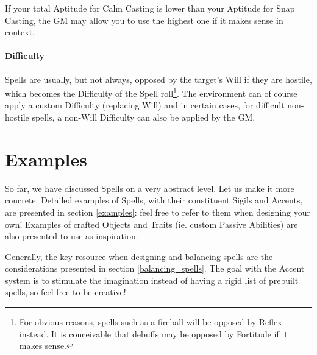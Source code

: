 If your total Aptitude for Calm Casting is lower than your Aptitude for Snap Casting, the GM may allow you to use the highest one if it makes sense in context.


\paragraph{Difficulty}

Spells are usually, but not always, opposed by the target's Will if they are hostile, which becomes the Difficulty of the Spell roll\footnote{For obvious reasons, spells such as a fireball will be opposed by Reflex instead. It is conceivable that debuffs may be opposed by Fortitude if it makes sense.}. The environment can of course apply a custom Difficulty (replacing Will) and in certain cases, for difficult non-hostile spells, a non-Will Difficulty can also be applied by the GM.

\section{Examples}

So far, we have discussed Spells on a very abstract level. Let us make it more concrete. Detailed examples of Spells, with their constituent Sigils and Accents, are presented in section \ref{examples}: feel free to refer to them when designing your own! Examples of crafted Objects and Traits (ie. custom Passive Abilities) are also presented to use as inspiration.

Generally, the key resource when designing and balancing spells are the considerations presented in section \ref{balancing_spells}. The goal with the Accent system is to stimulate the imagination instead of having a rigid list of prebuilt spells, so feel free to be creative!














